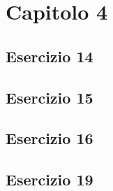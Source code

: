 \section{\textbf{Capitolo 4}}
\subsection{Esercizio 14}

\subsection{Esercizio 15}

\subsection{Esercizio 16}

\subsection{Esercizio 19}

